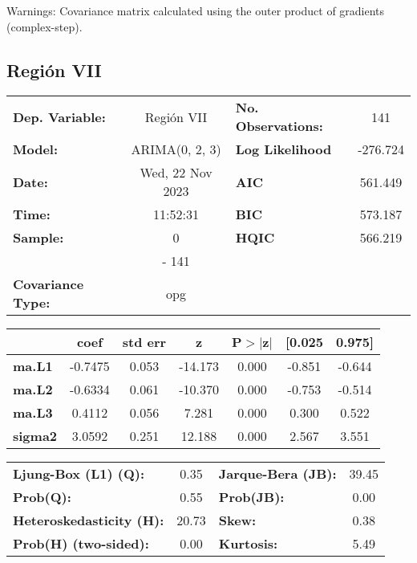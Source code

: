 \documentclass{article}%
\begin{document}
Warnings: \newline
 [1] Covariance matrix calculated using the outer product of gradients (complex-step).%
\subsection*{Región VII}%
\begin{center}
\begin{tabular}{lclc}
\toprule
\textbf{Dep. Variable:}          &    Región VII    & \textbf{  No. Observations:  } &    141      \\
\textbf{Model:}                  &  ARIMA(0, 2, 3)  & \textbf{  Log Likelihood     } &  -276.724   \\
\textbf{Date:}                   & Wed, 22 Nov 2023 & \textbf{  AIC                } &  561.449    \\
\textbf{Time:}                   &     11:52:31     & \textbf{  BIC                } &  573.187    \\
\textbf{Sample:}                 &        0         & \textbf{  HQIC               } &  566.219    \\
\textbf{}                        &       - 141      & \textbf{                     } &             \\
\textbf{Covariance Type:}        &       opg        & \textbf{                     } &             \\
\bottomrule
\end{tabular}
\begin{tabular}{lcccccc}
                & \textbf{coef} & \textbf{std err} & \textbf{z} & \textbf{P$> |$z$|$} & \textbf{[0.025} & \textbf{0.975]}  \\
\midrule
\textbf{ma.L1}  &      -0.7475  &        0.053     &   -14.173  &         0.000        &       -0.851    &       -0.644     \\
\textbf{ma.L2}  &      -0.6334  &        0.061     &   -10.370  &         0.000        &       -0.753    &       -0.514     \\
\textbf{ma.L3}  &       0.4112  &        0.056     &     7.281  &         0.000        &        0.300    &        0.522     \\
\textbf{sigma2} &       3.0592  &        0.251     &    12.188  &         0.000        &        2.567    &        3.551     \\
\bottomrule
\end{tabular}
\begin{tabular}{lclc}
\textbf{Ljung-Box (L1) (Q):}     &  0.35 & \textbf{  Jarque-Bera (JB):  } & 39.45  \\
\textbf{Prob(Q):}                &  0.55 & \textbf{  Prob(JB):          } &  0.00  \\
\textbf{Heteroskedasticity (H):} & 20.73 & \textbf{  Skew:              } &  0.38  \\
\textbf{Prob(H) (two-sided):}    &  0.00 & \textbf{  Kurtosis:          } &  5.49  \\
\bottomrule
\end{tabular}
\end{center}
\end{document}

